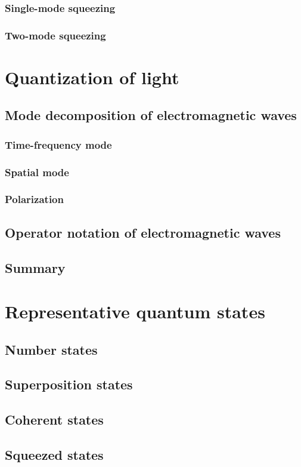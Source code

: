\documentclass{book}
\begin{document}
\subsection{Single-mode squeezing}
\subsection{Two-mode squeezing}

\chapter{Quantization of light}
\section{Mode decomposition of electromagnetic waves}
\subsection{Time-frequency mode}
\subsection{Spatial mode}
\subsection{Polarization}
\section{Operator notation of electromagnetic waves}
\section{Summary}

\chapter{Representative quantum states}
\section{Number states}
\section{Superposition states}
\section{Coherent states}
\section{Squeezed states}
\end{document}
